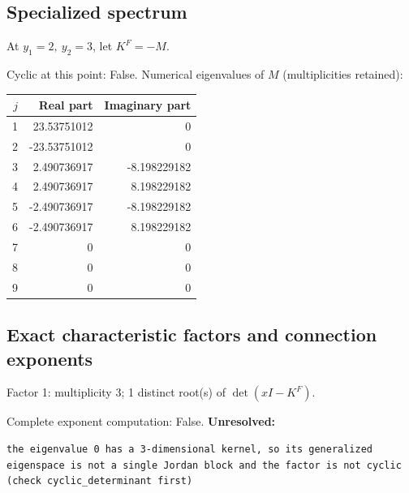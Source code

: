 \documentclass[10pt,a4paper]{article}
\newcommand{\fitmath}[1]{\sbox{\mathbox}{$\displaystyle #1$}\ifdim\wd\mathbox>\linewidth\resizebox{\linewidth}{!}{\usebox{\mathbox}}\else\usebox{\mathbox}\fi}
\begin{document}
\subsection*{Specialized spectrum}
At $y_1=2,\ y_2=3$, let $K^F=-M$.
\begin{center}\fitmath{\Delta=0}\end{center}
Cyclic at this point: False.
Numerical eigenvalues of $M$ (multiplicities retained):
\begin{center}\small\begin{tabular}{rrr}\toprule $j$ & Real part & Imaginary part\\\midrule
1 & 23.53751012 & 0\\
2 & -23.53751012 & 0\\
3 & 2.490736917 & -8.198229182\\
4 & 2.490736917 & 8.198229182\\
5 & -2.490736917 & -8.198229182\\
6 & -2.490736917 & 8.198229182\\
7 & 0 & 0\\
8 & 0 & 0\\
9 & 0 & 0\\
\bottomrule\end{tabular}\end{center}
\subsection*{Exact characteristic factors and connection exponents}
Factor 1: multiplicity 3; 1 distinct root(s) of $\det(xI-K^F)$.
\begin{center}\fitmath{\begin{aligned}p_{1}(x)&=x\end{aligned}}\end{center}
Complete exponent computation: False.
\textbf{Unresolved:}

\begin{lstlisting}
the eigenvalue 0 has a 3-dimensional kernel, so its generalized eigenspace is not a single Jordan block and the factor is not cyclic (check cyclic_determinant first)
\end{lstlisting}
\end{document}

